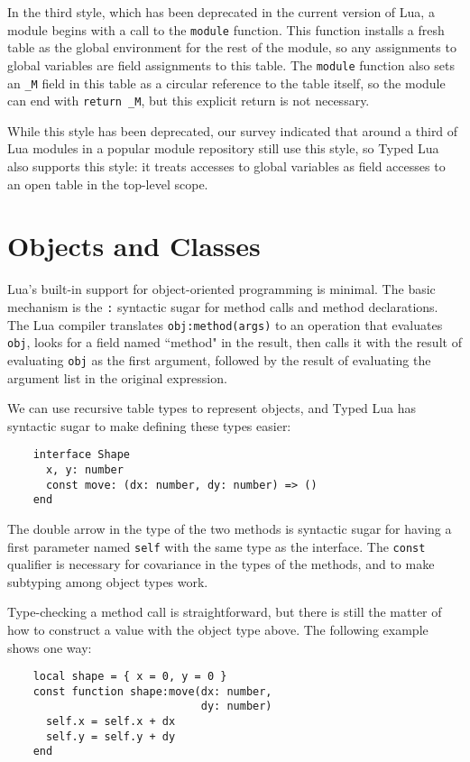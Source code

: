 \documentclass[preprint]{sig-alternate}
\begin{document}
In the third style, which has been deprecated in the current
version of Lua, a module begins with a call to the {\tt module}
function. This function installs a fresh table as the
global environment for the rest of the module, so any
assignments to global variables are field assignments to
this table. The {\tt module} function also sets an {\tt \_M}
field in this table as a circular reference to the table
itself, so the module can end with {\tt return \_M}, but
this explicit return is not necessary.

While this style has been deprecated, our survey indicated
that around a third of Lua modules in a popular module
repository still use this style, so Typed Lua also
supports this style: it treats accesses to global
variables as field accesses to an open table
in the top-level scope.

\section{Objects and Classes}
\label{sec:classes}

Lua's built-in support for object-oriented programming is
minimal. The basic mechanism is the {\tt :} syntactic
sugar for method calls and method declarations.
The Lua compiler translates {\tt obj:method(args)}
to an operation that evaluates {\tt obj}, looks
for a field named ``method" in the result, then calls
it with the result of evaluating {\tt obj} as the
first argument, followed by the result of evaluating
the argument list in the original expression.

We can use recursive table types to represent objects,
and Typed Lua has syntactic sugar to make defining these
types easier:

\begin{verbatim}
    interface Shape
      x, y: number
      const move: (dx: number, dy: number) => ()
    end
\end{verbatim}

The double arrow in the type of the two methods is
syntactic sugar for having a first parameter named
{\tt self} with the same type as the interface. The
{\tt const} qualifier is necessary for covariance
in the types of the methods, and to make subtyping
among object types work.

Type-checking a method call is straightforward, but
there is still the matter of how to construct a value with
the object type above. The following example shows one
way:

\begin{verbatim}
    local shape = { x = 0, y = 0 }
    const function shape:move(dx: number, 
                              dy: number)
      self.x = self.x + dx
      self.y = self.y + dy
    end
\end{verbatim}
\end{document}
